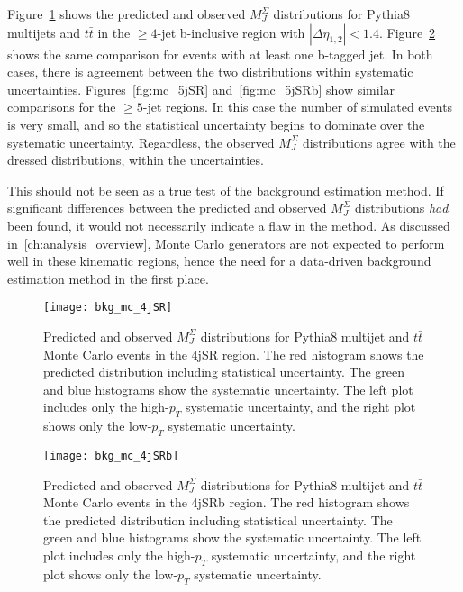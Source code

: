 Figure~\ref{fig:mc_4jSR} shows the predicted and observed $M_{J}^{\Sigma}$ distributions for Pythia8 multijets and $t\bar{t}$ in the $\geq4$-jet b-inclusive region with $|\Delta\eta_{1,2}|<1.4$.
Figure~\ref{fig:mc_4jSRb} shows the same comparison for events with at least one b-tagged jet.
In both cases, there is agreement between the two distributions within systematic uncertainties.
Figures~\ref{fig:mc_5jSR} and~\ref{fig:mc_5jSRb} show similar comparisons for the $\geq5$-jet regions.
In this case the number of simulated events is very small, and so the statistical uncertainty begins to dominate over the systematic uncertainty.
Regardless, the observed $M_{J}^{\Sigma}$ distributions agree with the dressed distributions, within the uncertainties.

This should not be seen as a true test of the background estimation method.
If significant differences between the predicted and observed $M_{J}^{\Sigma}$ distributions \textit{had} been found, it would not necessarily indicate a flaw in the method.
As discussed in~\ref{ch:analysis_overview}, Monte Carlo generators are not expected to perform well in these kinematic regions, hence the need for a data-driven background estimation method in the first place.

\begin{figure}[!ht]
    \centering
    \texttt{[image: bkg\_mc\_4jSR]}
    \caption{Predicted and observed $M_{J}^{\Sigma}$ distributions for Pythia8 multijet and $t\bar{t}$ Monte Carlo events in the 4jSR region.
    The red histogram shows the predicted distribution including statistical uncertainty.
    The green and blue histograms show the systematic uncertainty.
    The left plot includes only the high-$p_{T}$ systematic uncertainty, and the right plot shows only the low-$p_{T}$ systematic uncertainty.
    }
    \label{fig:mc_4jSR}
\end{figure}

\begin{figure}[!ht]
    \centering
    \texttt{[image: bkg\_mc\_4jSRb]}
    \caption{Predicted and observed $M_{J}^{\Sigma}$ distributions for Pythia8 multijet and $t\bar{t}$ Monte Carlo events in the 4jSRb region.
    The red histogram shows the predicted distribution including statistical uncertainty.
    The green and blue histograms show the systematic uncertainty.
    The left plot includes only the high-$p_{T}$ systematic uncertainty, and the right plot shows only the low-$p_{T}$ systematic uncertainty.}
    \label{fig:mc_4jSRb}
\end{figure}

